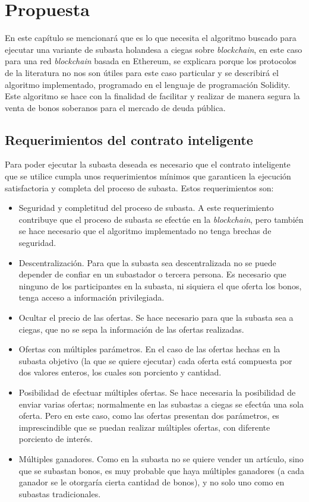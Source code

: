 \chapter{Propuesta}\label{chapter:proposal}

En este capítulo se mencionará que es lo que necesita el algoritmo buscado para ejecutar una variante de 
subasta holandesa
a ciegas sobre \textit{blockchain}, en este caso para una red \textit{blockchain} basada en Ethereum, se 
explicara porque los protocolos de la literatura no nos son útiles para este caso particular y se 
describirá el algoritmo implementado, programado en el lenguaje de programación Solidity. Este algoritmo 
se hace con la finalidad de facilitar y realizar de manera segura la venta de bonos soberanos para el 
mercado de deuda pública. 

\section{Requerimientos del contrato inteligente}
  Para poder ejecutar la subasta deseada es necesario que el contrato inteligente que se utilice cumpla
  unos requerimientos mínimos que garanticen la ejecución satisfactoria y completa del proceso de subasta.
  Estos requerimientos son:

  \begin{itemize}
    \item Seguridad y completitud del proceso de subasta. A este requerimiento contribuye que el proceso de
    subasta se efectúe en la \textit{blockchain}, pero también se hace necesario que el algoritmo implementado
    no tenga brechas de seguridad.
    \item Descentralización. Para que la subasta sea descentralizada no se puede depender de confiar en un
    subastador o tercera persona. Es necesario que ninguno de los participantes en la subasta, ni siquiera
    el que oferta los bonos, tenga acceso a información privilegiada.
    \item Ocultar el precio de las ofertas. Se hace necesario para que la subasta sea a ciegas, que
    no se sepa la información de las ofertas realizadas.
    \item Ofertas con múltiples parámetros. En el caso de las ofertas hechas 
    en la subasta objetivo (la que se quiere ejecutar) cada oferta está compuesta por dos valores
    enteros, los cuales son porciento y cantidad. 
    \item Posibilidad de efectuar múltiples ofertas. Se hace necesaria la posibilidad de enviar varias 
    ofertas; normalmente en las subastas a ciegas se efectúa una sola oferta. Pero en este caso, como
    las ofertas presentan dos parámetros, es imprescindible que se puedan realizar múltiples ofertas,
    con diferente porciento de interés.
    \item Múltiples ganadores. Como en la subasta no se quiere vender un artículo, sino que se subastan 
    bonos, es muy probable que haya múltiples ganadores (a cada ganador se le otorgaría
    cierta cantidad de bonos), y no solo uno como en subastas tradicionales.
  \end{itemize}


